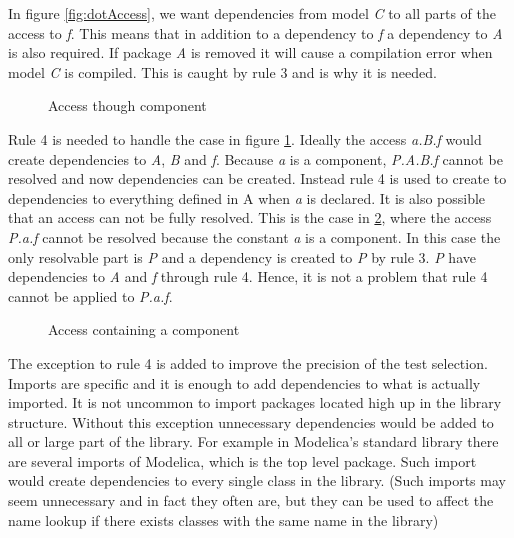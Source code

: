 \documentclass{cslthse-msc}
\begin{document}
In figure \ref{fig:dotAccess}, we want dependencies from model \textit{C} to all parts of the access to \textit{f}. This means that in addition to a dependency to \textit{f} a dependency to \textit{A} is also required. If package \textit{A} is removed it will cause a compilation error when model \textit{C} is compiled. This is caught by rule 3 and is why it is needed.


\begin{figure}[!htbp]
    \centering
    \qquad
    \subfloat{\raisebox{4.7 cm}{}}
    \caption{Access though component}
    \label{fig:component}
\end{figure}

Rule 4 is needed to handle the case in figure \ref{fig:component}. Ideally the access \textit{a.B.f} would create dependencies to \textit{A}, \textit{B} and \textit{f}. Because \textit{a} is a component, \textit{P.A.B.f} cannot be resolved and now dependencies can be created. Instead rule 4 is used to create to dependencies to everything defined in A when \textit{a} is declared.
It is also possible that an access can not be fully resolved. This is the case in \ref{fig:brokenAccess}, where the access \textit{P.a.f} cannot be resolved because the constant \textit{a} is a component. In this case the only resolvable part is \textit{P} and a  dependency is created to \textit{P} by rule 3. \textit{P} have dependencies to \textit{A} and \textit{f} through rule 4. Hence, it is not a problem that rule 4 cannot be applied to \textit{P.a.f}.

\begin{figure}[!htbp]
    \centering
    \qquad
    \subfloat{\raisebox{4.7 cm}{}}
    \caption{Access containing a component}
    \label{fig:brokenAccess}
\end{figure}

The exception to rule 4 is added to improve the precision of the test selection. Imports are specific and it is enough to add dependencies to what is actually imported. It is not uncommon to import packages located high up in the library structure. Without this exception unnecessary dependencies would be added to all or large part of the library. For example in Modelica's standard library there are several imports of Modelica, which is the top level package. Such import would create dependencies to every single class in the library. (Such imports may seem unnecessary and in fact they often are, but they can be used to affect the name lookup if there exists classes with the same name in the library)  
\end{document}
